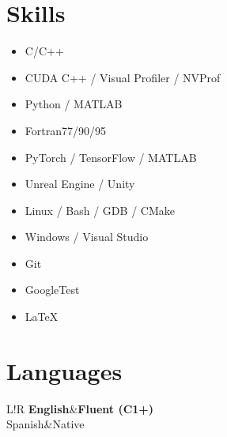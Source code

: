 \documentclass[8pt]{article}
\newcommand\VRule{\color{lightgray}\vrule width 0.5pt}
\begin{document}
\section*{Skills}

\begin{itemize}
	\item C/C++
	\item CUDA C++ / Visual Profiler / NVProf
	\item Python / MATLAB
	\item Fortran77/90/95
	\item PyTorch / TensorFlow / MATLAB
	\item Unreal Engine / Unity
	\item Linux / Bash / GDB / CMake
	\item Windows / Visual Studio
	\item Git
	\item GoogleTest
	\item \LaTeX
\end{itemize}

\section*{Languages}
\begin{tabular}{L!{\VRule}R}
{\bf English}&{\bf Fluent (C1+)}\\
{Spanish}&{Native}\\
\end{tabular}
\end{document}
